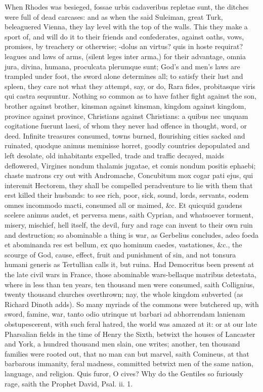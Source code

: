 {When Rhodes was besieged, fossae urbis cadaveribus repletae sunt,
the ditches were full of dead carcases: and as when the said Suleiman,
great Turk, beleaguered Vienna, they lay level with the top of the
walls. This they make a sport of, and will do it to their friends and
confederates, against oaths, vows, promises, by treachery or otherwise;
-dolus an virtus? quis in hoste requirat? leagues and laws of
arms, (silent leges inter arma,) for their advantage, omnia jura,
divina, humana, proculcata plerumque sunt; God's and men's laws are
trampled under foot, the sword alone determines all; to satisfy their
lust and spleen, they care not what they attempt, say, or do, Rara
fides, probitasque viris qui castra sequuntur. Nothing so common as to
have  father fight against the son, brother against brother,
kinsman against kinsman, kingdom against kingdom, province against
province, Christians against Christians: a quibus nec unquam
cogitatione fuerunt laesi, of whom they never had offence in thought,
word, or deed. Infinite treasures consumed, towns burned, flourishing
cities sacked and ruinated, quodque animus meminisse horret, goodly
countries depopulated and left desolate, old inhabitants expelled,
trade and traffic decayed, maids deflowered, Virgines nondum thalamis
jugatae, et comis nondum positis ephaebi; chaste matrons cry out with
Andromache, Concubitum mox cogar pati ejus, qui interemit
Hectorem, they shall be compelled peradventure to lie with them that
erst killed their husbands: to see rich, poor, sick, sound, lords,
servants, eodem omnes incommodo macti, consumed all or maimed, \&c. Et
quicquid gaudens scelere animus audet, et perversa mens, saith Cyprian,
and whatsoever torment, misery, mischief, hell itself, the devil, 
fury and rage can invent to their own ruin and destruction; so
abominable a thing is war, as Gerbelius concludes, adeo foeda et
abominanda res est bellum, ex quo hominum caedes, vastationes, \&c., the
scourge of God, cause, effect, fruit and punishment of sin, and not
tonsura humani generis as Tertullian calls it, but ruina. Had
Democritus been present at the late civil wars in France, those
abominable wars-bellaque matribus detestata, where in less than
ten years, ten thousand men were consumed, saith Collignius, twenty
thousand churches overthrown; nay, the whole kingdom subverted (as
Richard Dinoth adds). So many myriads of the commons were
butchered up, with sword, famine, war, tanto odio utrinque ut barbari
ad abhorrendam lanienam obstupescerent, with such feral hatred, the
world was amazed at it: or at our late Pharsalian fields in the time of
Henry the Sixth, betwixt the houses of Lancaster and York, a hundred
thousand men slain, one writes; another, ten thousand
families were rooted out, that no man can but marvel, saith Comineus,
at that barbarous immanity, feral madness, committed betwixt men of the
same nation, language, and religion. Quis furor, O cives? Why do
the Gentiles so furiously rage, saith the Prophet David, Psal. ii. 1.

}
